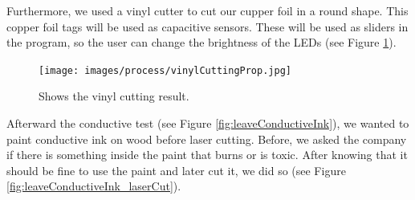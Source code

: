 \documentclass[doc.tex]{subfiles}
\begin{document}
    \noindent
    Furthermore, we used a vinyl cutter to cut our cupper foil in a round shape. This copper foil 
    tags will be used as capacitive sensors. These will be used as sliders in the program, so the 
    user can change the brightness of the LEDs (see Figure \ref{fig:vinylCuttingProp}).

    \begin{figure}[h!]
        \centering
        \texttt{[image: images/process/vinylCuttingProp.jpg]}
        \caption{Shows the vinyl cutting result.}
        \label{fig:vinylCuttingProp}
    \end{figure}

    \noindent
    Afterward the conductive test (see Figure \ref{fig:leaveConductiveInk}), we wanted to paint conductive ink on wood before laser cutting. Before,
    we asked the company if there is something inside the paint that burns or is toxic. 
    After knowing that it should be fine to use the paint and later cut it, we did so (see Figure \ref{fig:leaveConductiveInk_laserCut}). 
\end{document}
